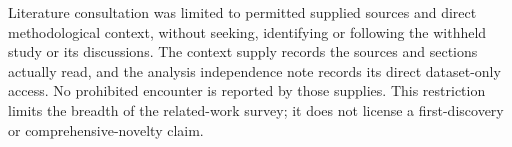 Literature consultation was limited to permitted supplied sources and direct methodological context, without seeking, identifying or following the withheld study or its discussions. The context supply records the sources and sections actually read, and the analysis independence note records its direct dataset-only access. No prohibited encounter is reported by those supplies. This restriction limits the breadth of the related-work survey; it does not license a first-discovery or comprehensive-novelty claim.
